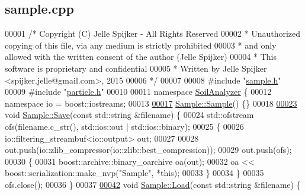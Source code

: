 \hypertarget{sample_8cpp_source}{}\subsection{sample.\+cpp}
\label{sample_8cpp_source}

\begin{DoxyCode}
00001 \textcolor{comment}{/* Copyright (C) Jelle Spijker - All Rights Reserved}
00002 \textcolor{comment}{ * Unauthorized copying of this file, via any medium is strictly prohibited}
00003 \textcolor{comment}{ * and only allowed with the written consent of the author (Jelle Spijker)}
00004 \textcolor{comment}{ * This software is proprietary and confidential}
00005 \textcolor{comment}{ * Written by Jelle Spijker <spijker.jelle@gmail.com>, 2015}
00006 \textcolor{comment}{ */}
00007 
00008 \textcolor{preprocessor}{#include "\hyperlink{sample_8h}{sample.h}"}
00009 \textcolor{preprocessor}{#include "\hyperlink{particle_8h}{particle.h}"}
00010 
00011 \textcolor{keyword}{namespace }\hyperlink{namespace_soil_analyzer}{SoilAnalyzer} \{
00012 \textcolor{keyword}{namespace }io = boost::iostreams;
00013 
\hypertarget{sample_8cpp_source_l00017}{}\hyperlink{class_soil_analyzer_1_1_sample_a6b7513ef6317fc86181d5b9901d0ce07}{00017} \hyperlink{class_soil_analyzer_1_1_sample_a6b7513ef6317fc86181d5b9901d0ce07}{Sample::Sample}() \{\}
00018 
\hypertarget{sample_8cpp_source_l00023}{}\hyperlink{class_soil_analyzer_1_1_sample_acb0fa4729d078f7c8fba70411469a67d}{00023} \textcolor{keywordtype}{void} \hyperlink{class_soil_analyzer_1_1_sample_acb0fa4729d078f7c8fba70411469a67d}{Sample::Save}(\textcolor{keyword}{const} std::string &filename) \{
00024   std::ofstream ofs(filename.c\_str(), std::ios::out | std::ios::binary);
00025   \{
00026     io::filtering\_streambuf<io::output> out;
00027 
00028     out.push(io::zlib\_compressor(io::zlib::best\_compression));
00029     out.push(ofs);
00030     \{
00031       boost::archive::binary\_oarchive oa(out);
00032       oa << boost::serialization::make\_nvp(\textcolor{stringliteral}{"Sample"}, *\textcolor{keyword}{this});
00033     \}
00034   \}
00035   ofs.close();
00036 \}
00037 
\hypertarget{sample_8cpp_source_l00042}{}\hyperlink{class_soil_analyzer_1_1_sample_afbb2db434d2e0a317c5b056371bf43fe}{00042} \textcolor{keywordtype}{void} \hyperlink{class_soil_analyzer_1_1_sample_afbb2db434d2e0a317c5b056371bf43fe}{Sample::Load}(\textcolor{keyword}{const} std::string &filename) \{

\end{DoxyCode}
